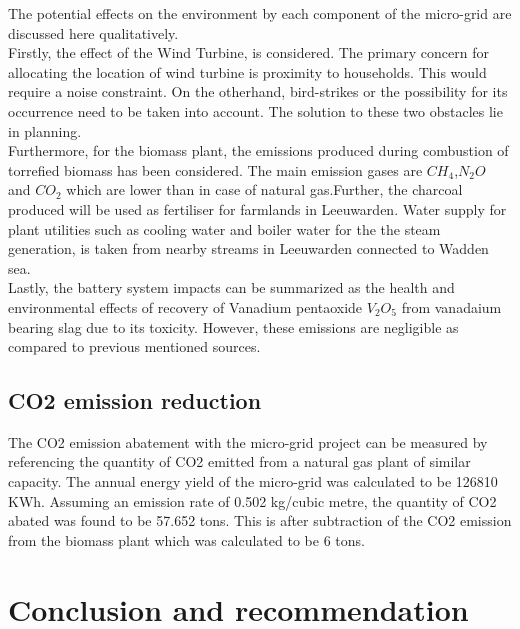 The potential effects on the environment by each component of the micro-grid are discussed here qualitatively.\\
\newline
Firstly, the effect of the Wind Turbine, is considered. The primary concern for allocating the location of wind turbine is proximity to households. This would require a noise constraint. On the otherhand, bird-strikes or the possibility for its occurrence need to be taken into account. The solution to these two obstacles lie in planning. 
\newline\\
Furthermore, for the biomass plant, the emissions produced during combustion of torrefied biomass has been considered. The main emission gases are $CH_{4}$,$N_{2}O$ and $CO_{2}$ which are lower than in case of natural gas\citep{derks_2018}.Further, the charcoal produced will be used as fertiliser for farmlands in Leeuwarden. Water supply for plant utilities such as cooling water and boiler water for the the steam generation, is taken from nearby streams in Leeuwarden connected to Wadden sea.   
\newline\\
Lastly, the battery system impacts can be summarized as the health and environmental effects of recovery of Vanadium pentaoxide $V_{2}O_{5}$ from vanadaium bearing slag due to its toxicity\citep{weber_peters_baumann_weil_2018}. However, these emissions are negligible as compared to previous mentioned sources.

\subsection{CO2 emission reduction}

The CO2 emission abatement with the micro-grid project can be measured by referencing the quantity of CO2 emitted from a natural gas plant of similar capacity. The annual energy yield of the micro-grid was calculated to be 126810 KWh. Assuming an emission rate of 0.502 kg/cubic metre, the quantity of CO2 abated was found to be 57.652 tons. This is after subtraction of the CO2 emission from the biomass plant which was calculated to be 6 tons\citep{derks_2018}.  


\noindent 

\section{Conclusion and recommendation}
